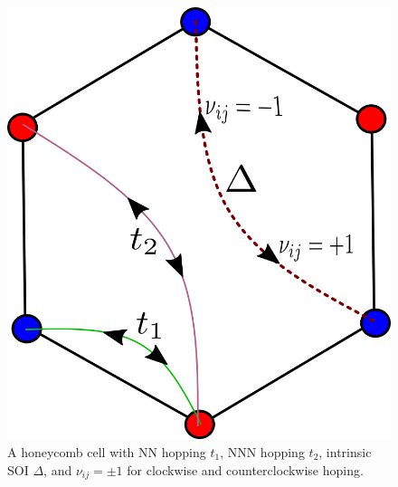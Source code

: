 \documentclass[aps,prl,twocolumn,amsmath,amssymb,nobibnotes]{revtex4-1}%
\begin{document}
\begin{figure}[t]
\centering
\includegraphics[width=0.6\columnwidth]{kmh.png}
\caption{A honeycomb cell with NN hopping $t_1$, NNN hopping $t_2$, intrinsic SOI $\Delta$, and $\nu_{ij} = \pm 1$ for clockwise and counterclockwise hoping.}
\label{fig1}
\vspace*{-6pt}
\end{figure}
\end{document}
